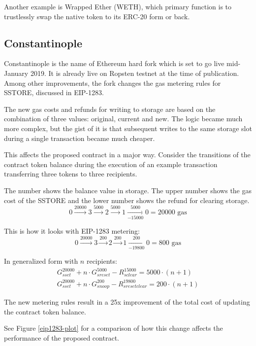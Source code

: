 \documentclass[12pt]{article}
\begin{document}
Another example is Wrapped Ether (WETH), which primary function is to trustlessly swap the native token to its ERC-20 form or back.

\subsection{Constantinople}

Constantinople is the name of Ethereum hard fork which is set to go live mid-January 2019.
It is already live on Ropsten testnet at the time of publication.
Among other improvements, the fork changes the gas metering rules for SSTORE,
discussed in EIP-1283\cite{eip1283}.

The new gas costs and refunds for writing to storage are based on the combination of three values: original, current and new.
The logic became much more complex, but the gist of it is that subsequent writes to the same storage slot during a single transaction became much cheaper.

This affects the proposed contract in a major way.
Consider the transitions of the contract token balance during the execution of an example transaction transferring three tokens to three recipients.

The number shows the balance value in storage. The upper number shows the gas cost of the SSTORE and the lower number shows the refund for clearing storage.
\begin{equation}
0 \xrightarrow{20000} 3 \xrightarrow{5000} 2 \xrightarrow{5000} 1 \xrightarrow[-15000]{5000} 0 = 20000 \text{ gas}	
\end{equation}

This is how it looks with EIP-1283 metering:
\begin{equation}
0 \xrightarrow{20000} 3 \xrightarrow{200} 2 \xrightarrow{200} 1 \xrightarrow[-19800]{200} 0 = 800 \text{ gas}	
\end{equation}

In generalized form with $n$ recipients:
\begin{gather}
G_{sset}^{20000} + n \cdot G_{sreset}^{5000} - R_{sclear}^{15000} = 5000 \cdot (n + 1) \\
G_{sset}^{20000} + n \cdot G_{snoop}^{200} - R_{sresetclear}^{19800} = 200 \cdot (n + 1)
\end{gather}

The new metering rules result in a 25x improvement of the total cost of updating the contract token balance.

See Figure \ref{eip1283-plot} for a comparison of how this change affects the performance of the proposed contract.
\end{document}

